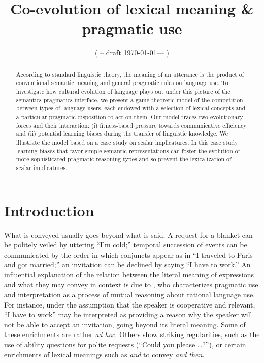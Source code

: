 \documentclass[a4paper, 11pt]{article}
\title{Co-evolution of lexical meaning \& pragmatic use}
\author{%
    ( -- draft \today --- )
}
\date{}
\theoremstyle{Satz}
\begin{document}

\maketitle

\begin{abstract}
  According to standard linguistic theory, the meaning of an utterance is the product of
  conventional semantic meaning and general pragmatic rules on language use. To investigate how
  cultural evolution of language plays out under this picture of the semantics-pragmatics
  interface, we present a game theoretic model of the competition between types of language
  users, each endowed with a selection of lexical concepts and a particular pragmatic
  disposition to act on them. Our model traces two evolutionary forces and their interaction:
  (i) fitness-based pressure towards communicative efficiency and (ii) potential learning
  biases during the transfer of linguistic knowledge. We illustrate the model based on a case
  study on scalar implicatures. In this case study learning biases that favor simple semantic
  representations can foster the evolution of more sophisticated pragmatic reasoning types and
  so prevent the lexicalization of scalar implicatures.
\end{abstract}

\section{Introduction}\label{sec:introduction}
What is conveyed usually goes beyond what is said. A request for a blanket can be politely
veiled by uttering ``I'm cold;'' temporal succession of events can be communicated by the order
in which conjuncts appear as in ``I traveled to Paris and got married;'' an invitation can be
declined by saying ``I have to work.'' An influential explanation of the relation between the
literal meaning of expressions and what they may convey in context is due to
\citet{grice:1975}, who characterizes pragmatic use and interpretation as a process of mutual
reasoning about rational language use. For instance, under the assumption that the speaker is
cooperative and relevant, ``I have to work'' may be interpreted as providing a reason why the
speaker will not be able to accept an invitation, going beyond its literal meaning. Some of
these enrichments are rather \emph{ad hoc}. Others show striking regularities, such as the use
of ability questions for polite requests (``Could you please \dots?''), or certain enrichments
of lexical meanings such as \emph{and} to convey \emph{and then}.
\end{document}

